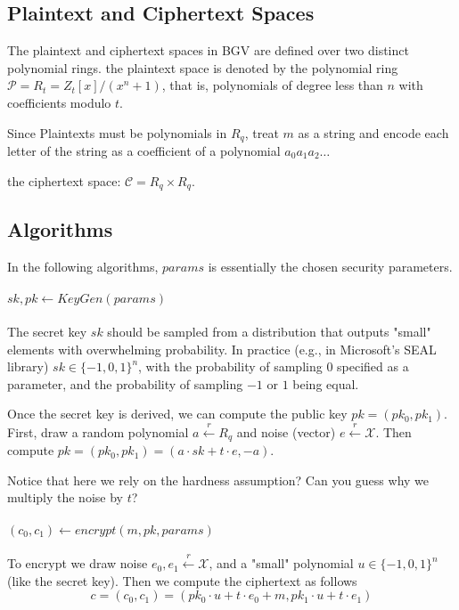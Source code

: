 \subsection{Plaintext and Ciphertext Spaces}
The plaintext and ciphertext spaces in BGV are defined over two distinct
polynomial rings. the plaintext space is denoted by the polynomial
ring $\mathcal{P}=R_{t}= Z_{t}\left[x\right]/\left(x^{n}+1\right)$,
that is, polynomials of degree less than $n$ with coefficients modulo
$t$. 
\begin{remark}
    Since Plaintexts must be polynomials in $R_q$, treat 
    $m$ as a string and encode each letter of the string as a coefficient of a polynomial
    $a_{0}a_{1}a_{2}\dots$
\end{remark}


the ciphertext space: $\mathcal{C}=R_q \times R_q$. 

\subsection{Algorithms}
In the following algorithms, $params$ is essentially the chosen security parameters. 
\paragraph{$sk,pk \leftarrow KeyGen(params)$}
The secret key $sk$ should be sampled from a distribution that outputs "small" elements 
with overwhelming probability. In practice (e.g., in Microsoft's SEAL library) $sk\in\{-1,0,1\}^n$,
with the probability of sampling 0 specified as a parameter, and the probability of sampling $-1$ or $1$
being equal. 

Once the secret key is derived, we can compute the public key $pk=(pk_0,pk_1)$.
First, draw a random polynomial $a\overset{r}{\leftarrow} R_q$ and 
noise (vector) $e\overset{r}{\leftarrow} \mathcal{X}$. Then compute 
$pk=(pk_0,pk_1)=(a\cdot sk+t\cdot e, -a)$.

Notice that here we rely on the hardness assumption? 
Can you guess why we multiply the noise by $t$?

\paragraph{$(c_0,c_1) \leftarrow encrypt(m,pk, params)$}
To encrypt we draw noise $e_0,e_1 \overset{r}{\leftarrow} \mathcal{X}$, and a "small" polynomial 
$u\in \{-1,0,1\}^n$ (like the secret key).
Then we compute the ciphertext as follows $$c=(c_0,c_1)= (pk_0\cdot u +t\cdot e_0+m, pk_1\cdot u +t\cdot e_1)$$

